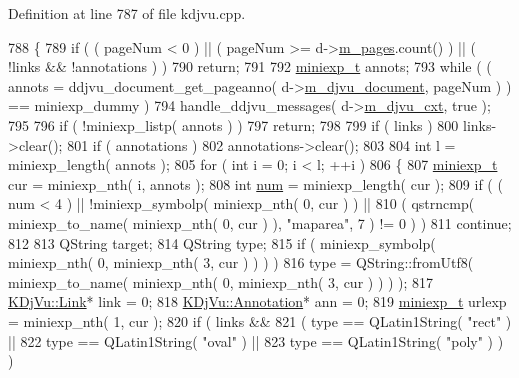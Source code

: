 Definition at line 787 of file kdjvu.\+cpp.


\begin{DoxyCode}
788 \{
789     \textcolor{keywordflow}{if} ( ( pageNum < 0 ) || ( pageNum >= d->\hyperlink{classKDjVu_1_1Private_a0c009b87dde95717ec9e9a8f701e6628}{m\_pages}.count() ) || ( !links && !annotations ) )
790         \textcolor{keywordflow}{return};
791 
792     \hyperlink{kdjvu_8h_a58955b1a7edfc6e6ccb48402f744802b}{miniexp\_t} annots;
793     \textcolor{keywordflow}{while} ( ( annots = ddjvu\_document\_get\_pageanno( d->\hyperlink{classKDjVu_1_1Private_a183f9508738c71bb5abab150619a5ccd}{m\_djvu\_document}, pageNum ) ) == 
      miniexp\_dummy )
794         handle\_ddjvu\_messages( d->\hyperlink{classKDjVu_1_1Private_a5a52150a7ab9bbd584d6d73d68ae9ba1}{m\_djvu\_cxt}, \textcolor{keyword}{true} );
795 
796     \textcolor{keywordflow}{if} ( !miniexp\_listp( annots ) )
797         \textcolor{keywordflow}{return};
798 
799     \textcolor{keywordflow}{if} ( links )
800         links->clear();
801     \textcolor{keywordflow}{if} ( annotations )
802         annotations->clear();
803 
804     \textcolor{keywordtype}{int} l = miniexp\_length( annots );
805     \textcolor{keywordflow}{for} ( \textcolor{keywordtype}{int} i = 0; i < l; ++i )
806     \{
807         \hyperlink{kdjvu_8h_a58955b1a7edfc6e6ccb48402f744802b}{miniexp\_t} cur = miniexp\_nth( i, annots );
808         \textcolor{keywordtype}{int} \hyperlink{dvi_2util_8cpp_acc54804c2bc92eef873c373c37b69ff7}{num} = miniexp\_length( cur );
809         \textcolor{keywordflow}{if} ( ( num < 4 ) || !miniexp\_symbolp( miniexp\_nth( 0, cur ) ) ||
810              ( qstrncmp( miniexp\_to\_name( miniexp\_nth( 0, cur ) ), \textcolor{stringliteral}{"maparea"}, 7 ) != 0 ) )
811             \textcolor{keywordflow}{continue};
812 
813         QString target;
814         QString type;
815         \textcolor{keywordflow}{if} ( miniexp\_symbolp( miniexp\_nth( 0, miniexp\_nth( 3, cur ) ) ) )
816             type = QString::fromUtf8( miniexp\_to\_name( miniexp\_nth( 0, miniexp\_nth( 3, cur ) ) ) );
817         \hyperlink{classKDjVu_1_1Link}{KDjVu::Link}* link = 0;
818         \hyperlink{classKDjVu_1_1Annotation}{KDjVu::Annotation}* ann = 0;
819         \hyperlink{kdjvu_8h_a58955b1a7edfc6e6ccb48402f744802b}{miniexp\_t} urlexp = miniexp\_nth( 1, cur );
820         \textcolor{keywordflow}{if} ( links &&
821              ( type == QLatin1String( \textcolor{stringliteral}{"rect"} ) ||
822                type == QLatin1String( \textcolor{stringliteral}{"oval"} ) ||
823                type == QLatin1String( \textcolor{stringliteral}{"poly"} ) ) )

\end{DoxyCode}
